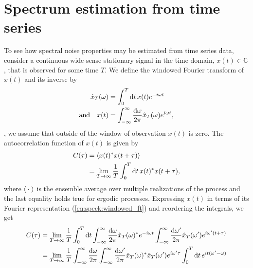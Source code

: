 \section{Spectrum estimation from time series}\label{sec:speck:theory:time_series_estimation}
To see how spectral noise properties may be estimated from time series data, consider a continuous wide-sense stationary
signal in the time domain, $x(t)\in\mathbb{C}$, that is observed for some time $T$.
We define the windowed Fourier transform of $x(t)$ and its inverse by
\begin{align}
    \hat{x}_T(\omega) &= \int_{0}^{T}\dd{t} x(t)\e^{-\i\omega t} \label{eq:speck:windowed_ft}\\
       \qq*{and} x(t) &= \intinf\ddf{\omega}\hat{x}_T(\omega)\e^{\i\omega t}, \label{eq:speck:windowed_ft:inverse}
\end{align}
\ie, we assume that outside of the window of observation $x(t)$ is zero.
The autocorrelation function of $x(t)$ is given by
\begin{align}
    C(\tau) &= \expval{x(t)\conjugate x(t + \tau)} \label{eq:speck:autocorrelation}\\
            &= \lim_{T\to\infty} \frac{1}{T}\int_0^T\dd{t} x(t)\conjugate x(t + \tau),
\end{align}
where $\expval{\:\cdot\:}$ is the ensemble average over multiple realizations of the process and the last equality holds true for ergodic processes.
Expressing $x(t)$ in terms of its Fourier representation (\cref{eq:speck:windowed_ft}) and reordering the integrals, we get
\begin{align}
    C(\tau) &= \lim_{T\to\infty}\frac{1}{T}\int_0^T\dd{t}
                \int_{-\infty}^{\infty}\frac{\dd{\omega}}{2\pi}\hat{x}_T(\omega)^\ast e^{-i\omega t}
                \int_{-\infty}^{\infty}\frac{\dd{\omega^\prime}}{2\pi}\hat{x}_T(\omega^\prime)e^{i\omega^\prime (t + \tau)}  \\
            &= \lim_{T\to\infty}\frac{1}{T}\int_{-\infty}^{\infty}\frac{\dd{\omega}}{2\pi}\int_{-\infty}^{\infty}\frac{\dd{\omega^\prime}}{2\pi}
                \hat{x}_T(\omega)^\ast\hat{x}_T(\omega^\prime)e^{i\omega^\prime\tau}
                \int_0^T\dd{t}e^{i t (\omega^\prime - \omega)} \label{eq:speck:autocorrelation:fourier}
\end{align}
